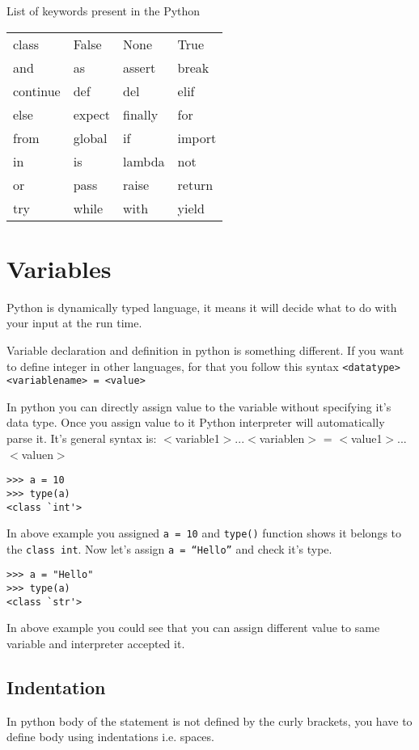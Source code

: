 \documentclass[letterpaper,12pt]{book}
\begin{document}
List of keywords present in the Python\\
\begin{center}
\begin{tabular}{llll}
class & False & None & True\\
and & as & assert & break \\
continue & def & del & elif \\
else & expect & finally & for \\
from & global & if & import \\
in & is & lambda & not \\
or & pass & raise & return \\
try & while & with & yield
\end{tabular}
\end{center}

\section{Variables}
Python is dynamically typed language, it means it will decide what to do with your input at the run time. 

Variable declaration and definition in python is something different. If you want to define integer in other languages, for that you follow this syntax \texttt{<data\textunderscore type> <variable\textunderscore name> = <value>}

In python you can directly assign value to the variable without specifying it's data type. Once you assign value to it Python interpreter will automatically parse it.
It's general syntax is: $<$variable1$>$...$<$variablen$>$ = $<$value1$>$...$<$valuen$>$
\begin{verbatim}
>>> a = 10
>>> type(a)
<class `int'>
\end{verbatim}
In above example you assigned \texttt{a = 10} and \texttt{type()} function shows it belongs to the \texttt{class int}.
Now let's assign \texttt{a = ``Hello''} and check it's type.
\begin{verbatim}
>>> a = "Hello"
>>> type(a)
<class `str'>
\end{verbatim}
In above example you could see that you can assign different value to same variable and interpreter accepted it.
\subsection{Indentation}
In python body of the statement is not defined by the curly brackets, you have to define body using indentations i.e. spaces.
\end{document}
